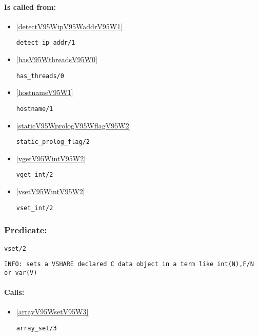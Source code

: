 \paragraph{Is called from:} 
\begin{itemize}
\item \ref{detectV95WipV95WaddrV95W1} 
\begin{verbatim}
detect_ip_addr/1
\end{verbatim}

\item \ref{hasV95WthreadsV95W0} 
\begin{verbatim}
has_threads/0
\end{verbatim}

\item \ref{hostnameV95W1} 
\begin{verbatim}
hostname/1
\end{verbatim}

\item \ref{staticV95WprologV95WflagV95W2} 
\begin{verbatim}
static_prolog_flag/2
\end{verbatim}

\item \ref{vgetV95WintV95W2} 
\begin{verbatim}
vget_int/2
\end{verbatim}

\item \ref{vsetV95WintV95W2} 
\begin{verbatim}
vset_int/2
\end{verbatim}

\end{itemize}

\subsubsection{Predicate:} \label{vsetV95W2}

\begin{verbatim}
vset/2
\end{verbatim}

{\small \begin{verbatim}
INFO: sets a VSHARE declared C data object in a term like int(N),F/N or var(V)

\end{verbatim}}
\paragraph{Calls:} 
\begin{itemize}
\item \ref{arrayV95WsetV95W3} 
\begin{verbatim}
array_set/3
\end{verbatim}

\end{itemize}
